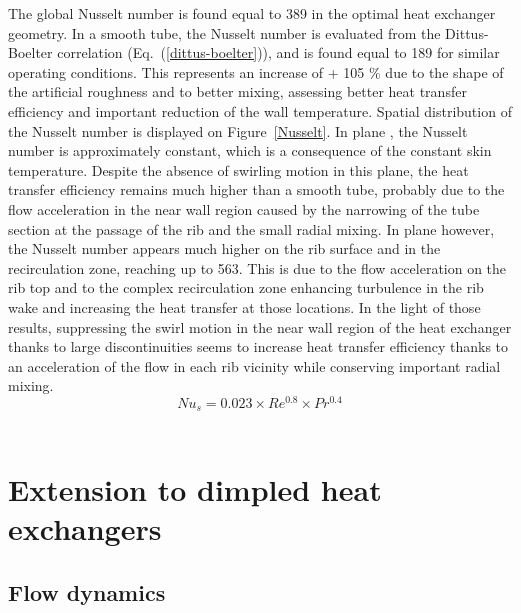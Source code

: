 The global Nusselt number is found equal to 389 in the optimal heat exchanger geometry. In a smooth tube, the Nusselt number is evaluated from the Dittus-Boelter correlation \cite{DittusBoelter1930} (Eq.~(\ref{dittus-boelter})), and is found equal to 189 for similar operating conditions. This represents an increase of + 105 \% due to the shape of the artificial roughness and to better mixing, assessing better heat transfer efficiency and important reduction of the wall temperature. Spatial distribution of the Nusselt number is displayed on Figure~\ref{Nusselt}. In plane , the Nusselt number is approximately constant, which is a consequence of the constant skin temperature. Despite the absence of swirling motion in this plane, the heat transfer efficiency remains much higher than a smooth tube, probably due to the flow acceleration in the near wall region caused by the narrowing of the tube section at the passage of the rib and the small radial mixing. In plane  however, the Nusselt number appears much higher on the rib surface and in the recirculation zone, reaching up to 563. This is due to the flow acceleration on the rib top and to the complex recirculation zone enhancing turbulence in the rib wake and increasing the heat transfer at those locations. In the light of those results, suppressing the swirl motion in the near wall region of the heat exchanger thanks to large discontinuities seems to increase heat transfer efficiency thanks to an acceleration of the flow in each rib vicinity while conserving important radial mixing.\\

\begin{equation}
Nu_s = 0.023 \times Re^{0.8} \times Pr^{0.4}
\label{dittus-boelter}
\end{equation}\\

\section{Extension to dimpled heat exchangers}
\label{sec:optim_discussion}

\subsection{Flow dynamics}
\label{sec:transition_shape}

